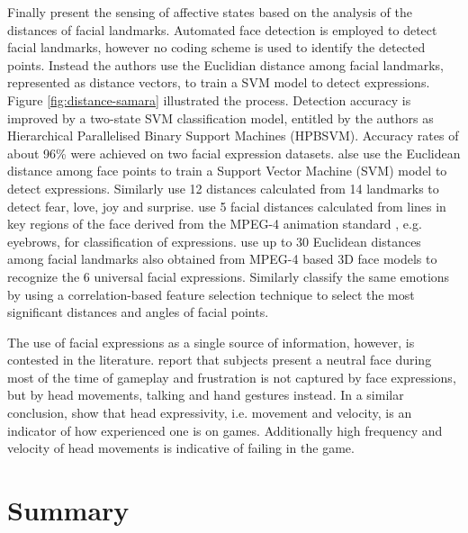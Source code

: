 Finally \textcite{samara2016sensing} present the sensing of affective states based on the analysis of the distances of facial landmarks. Automated face detection is employed to detect facial landmarks, however no coding scheme is used to identify the detected points. Instead the authors use the Euclidian distance among facial landmarks, represented as distance vectors, to train a SVM model to detect expressions. Figure \ref{fig:distance-samara} illustrated the process. Detection accuracy is improved by a two-state SVM classification model, entitled by the authors as Hierarchical Parallelised Binary Support Machines (HPBSVM). Accuracy rates of about 96\% were achieved on two facial expression datasets. \textcite{samara2016sensing} alse use the Euclidean distance among face points to train a Support Vector Machine (SVM) model to detect expressions. Similarly \textcite{chang2009emotion} use 12 distances calculated from 14 landmarks to detect fear, love, joy and surprise. \textcite{hammal2007facial} use 5 facial distances calculated from lines in key regions of the face derived from the MPEG-4 animation standard \parencite{abrantes1999mpeg}, e.g. eyebrows, for classification of expressions. \textcite{tang20083d,tang2008line} use up to 30 Euclidean distances among facial landmarks also obtained from MPEG-4 based 3D face models to recognize the 6 universal facial expressions. Similarly \textcite{hupont2013facial} classify the same emotions by using a correlation-based feature selection technique to select the most significant distances and angles of facial points.

The use of facial expressions as a single source of information, however, is contested in the literature. \textcite{blom2014towards} report that subjects present a neutral face during most of the time of gameplay and frustration is not captured by face expressions, but by head movements, talking and hand gestures instead. In a similar conclusion, \textcite{shaker2011game} show that head expressivity, i.e. movement and velocity, is an indicator of how experienced one is on games. Additionally high frequency and velocity of head movements is indicative of failing in the game.

\section{Summary}
\label{s:literature-face-summary}


